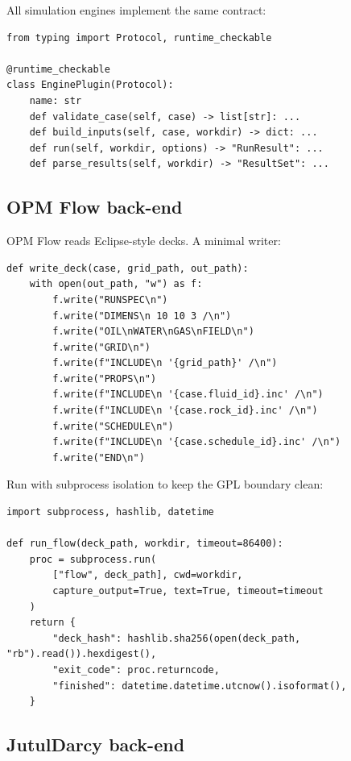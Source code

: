 \documentclass[10pt,a4paper]{article}
\begin{document}
All simulation engines implement the same contract:

\begin{lstlisting}[caption={Engine plug-in protocol.}]
from typing import Protocol, runtime_checkable

@runtime_checkable
class EnginePlugin(Protocol):
    name: str
    def validate_case(self, case) -> list[str]: ...
    def build_inputs(self, case, workdir) -> dict: ...
    def run(self, workdir, options) -> "RunResult": ...
    def parse_results(self, workdir) -> "ResultSet": ...
\end{lstlisting}

\subsection{OPM Flow back-end}

OPM Flow reads Eclipse-style decks. A minimal writer:

\begin{lstlisting}[caption={Deck writer for a black-oil case.}]
def write_deck(case, grid_path, out_path):
    with open(out_path, "w") as f:
        f.write("RUNSPEC\n")
        f.write("DIMENS\n 10 10 3 /\n")
        f.write("OIL\nWATER\nGAS\nFIELD\n")
        f.write("GRID\n")
        f.write(f"INCLUDE\n '{grid_path}' /\n")
        f.write("PROPS\n")
        f.write(f"INCLUDE\n '{case.fluid_id}.inc' /\n")
        f.write(f"INCLUDE\n '{case.rock_id}.inc' /\n")
        f.write("SCHEDULE\n")
        f.write(f"INCLUDE\n '{case.schedule_id}.inc' /\n")
        f.write("END\n")
\end{lstlisting}

Run with subprocess isolation to keep the GPL boundary clean:

\begin{lstlisting}[caption={Subprocess wrapper for OPM Flow.}]
import subprocess, hashlib, datetime

def run_flow(deck_path, workdir, timeout=86400):
    proc = subprocess.run(
        ["flow", deck_path], cwd=workdir,
        capture_output=True, text=True, timeout=timeout
    )
    return {
        "deck_hash": hashlib.sha256(open(deck_path, "rb").read()).hexdigest(),
        "exit_code": proc.returncode,
        "finished": datetime.datetime.utcnow().isoformat(),
    }
\end{lstlisting}

\subsection{JutulDarcy back-end}
\end{document}

